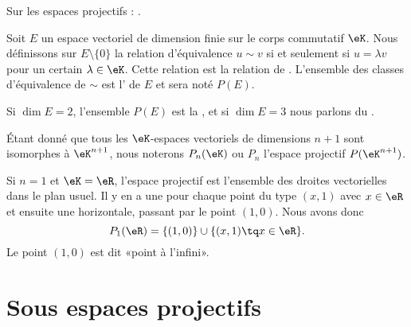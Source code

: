 
Sur les espaces projectifs : \cite{ProjRolland}.

\begin{definition}
    Soit \( E\) un espace vectoriel de dimension finie sur le corps commutatif \( \eK\). Nous définissons sur \( E\setminus\{ 0 \}\) la relation d'équivalence \( u\sim v\) si et seulement si \( u=\lambda v\) pour un certain \( \lambda\in\eK\). Cette relation est la relation de . L'ensemble des classes d'équivalence de \( \sim\) est l' de \( E\) et sera noté \( P(E)\).
\end{definition}

\begin{definition}  \label{DEFooTPPMooTDxNpg}
Si \( \dim E=2\), l'ensemble \( P(E)\) est la , et si \( \dim E=3\) nous parlons du .
\end{definition}

Étant donné que tous les \( \eK\)-espaces vectoriels de dimensions \( n+1\) sont isomorphes à \( \eK^{n+1}\), nous noterons \( P_n(\eK)\) ou \( P_n\) l'espace projectif \( P(\eK^{n+1})\). \label{PgNotimesjNtMoW}

\begin{example}
    Si \( n=1\) et \( \eK=\eR\), l'espace projectif est l'ensemble des droites vectorielles dans le plan usuel. Il y en a une pour chaque point du type \( (x,1)\) avec \( x\in\eR\) et ensuite une horizontale, passant par le point \( (1,0)\). Nous avons donc
    \begin{equation}
        P_1(\eR)=\{ (1,0) \}\cup\{ (x,1)\tq x\in \eR \}.
    \end{equation}
    Le point \( (1,0)\) est dit «point à l'infini».
\end{example}

\section{Sous espaces projectifs}

